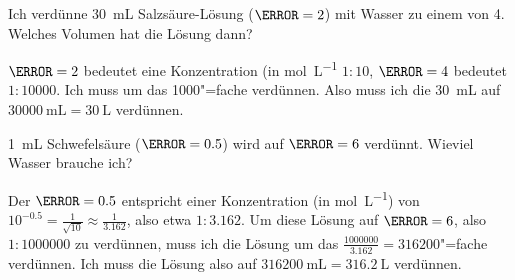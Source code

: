\documentclass{scrartcl}
\begin{document}
\begin{question}
  Ich verdünne \SI{30}{\milli\liter} Salzsäure-Lösung ($\pH = 2$) mit Wasser
  zu einem \pH{} von 4.  Welches Volumen hat die Lösung dann?
\end{question}
\begin{solution}
  $\pH = 2$ bedeutet eine Konzentration (in \si{\mole\per\liter}
  $\num{1}:\num{10}$, $\pH = 4$ bedeutet $\num{1}:\num{10000}$.  Ich muss um
  das \num{1000}"=fache verdünnen.  Also muss ich die \SI{30}{\milli\liter}
  auf $\SI{30000}{\milli\liter} = \SI{30}{\liter}$ verdünnen.
\end{solution}

\begin{question}
  \SI{1}{\milli\liter} Schwefelsäure ($\pH = 0.5$) wird auf $\pH = 6$
  verdünnt.  Wieviel Wasser brauche ich?
\end{question}
\begin{solution}
  Der $\pH = 0.5$ entspricht einer Konzentration (in \si{\mole\per\liter}) von
  $10^{-0.5} = \frac{1}{\sqrt{10}} \approx \frac{1}{3.162}$, also etwa
  $1:\num{3.162}$.  Um diese Lösung auf $\pH = 6$, also
  $\num{1}:\num{1000000}$ zu verdünnen, muss ich die Lösung um das
  $\frac{\num{1000000}}{\num{3.162}} = \num{316200}$"=fache verdünnen.  Ich
  muss die Lösung also auf $\SI{316200}{\milli\liter} = \SI{316.2}{\liter}$
  verdünnen.
\end{solution}

\newpage
{}
\printsolutions
\end{document}
